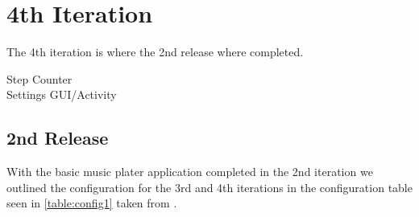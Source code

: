 \section{4th Iteration}
The 4th iteration is where the 2nd release where completed.

Step Counter \\
Settings GUI/Activity


\subsection{2nd Release}
With the basic music plater application completed in the 2nd iteration we outlined the configuration for the 3rd and 4th iterations in the configuration table seen in \ref{table:config1} taken from \citet{essence:config}.




